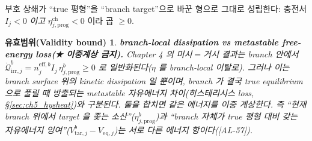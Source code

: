 \documentclass[11pt,a4paper]{article}
\newtheorem*{boundbox}{유효범위(Validity bound)}
\newcommand{\eff}{\mathrm{eff}}
\newcommand{\eq}{\mathrm{eq}}
\newcommand{\irr}{\mathrm{irr}}
\newcommand{\prog}{\mathrm{prog}}
\newcommand{\chg}{\mathrm{ch}}
\newcommand{\tar}{\mathrm{tar}}
\newcommand{\AL}[1]{\textsf{[AL-#1]}}
\begin{document}
부호 상쇄가 ``true 평형''을 ``branch target''으로 바꾼 형으로 그대로 성립한다: 충전서 $I_j<0$ \emph{이고}
$\eta_{j,\prog}^\chg<0$ 이라 곱 $\ge0$.
\begin{boundbox}
\textbf{branch-local dissipation vs metastable free-energy loss(★ 이중계상 금지).} Chapter 4 의 미시$=$거시
결과는 branch 안에서 $\dot{\mathcal Q}_{\irr,j}^b=n_j^{\eff,b}I_j\,\eta_{j,\prog}^b\ge0$ 로 일반화된다($\eta$ 를
branch-local 이탈로). 그러나 이는 \emph{branch surface 위의 kinetic dissipation} 일 뿐이며, branch 가 결국
true equilibrium 으로 풀릴 때 방출되는 \emph{metastable 자유에너지 차이}(히스테리시스 loss,
\S\ref{sec:ch5_hysheat})와 \emph{구분}된다. 둘을 합치면 같은 에너지를 이중 계상한다. 즉 ``현재 branch 위에서
target 을 좇는 소산''($\eta_{j,\prog}^b$)과 ``branch 자체가 true 평형 대비 갖는 자유에너지 잉여''($V_{\tar,j}^b
-V_{\eq,j}$)는 서로 다른 에너지 항이다(\AL{57}).
\end{boundbox}

\end{document}
